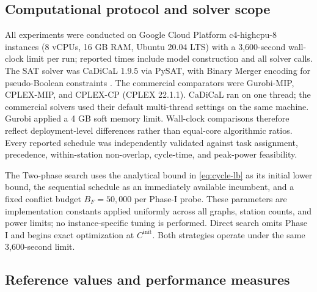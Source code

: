 \documentclass[]{interact}
\theoremstyle{plain}
\theoremstyle{definition}
\theoremstyle{remark}
\newcommand{\Cinit}{C^{\mathrm{init}}}
\begin{document}
\FloatBarrier
\subsection{Computational protocol and solver scope}

All experiments were conducted on Google Cloud Platform c4-highcpu-8 instances (8 vCPUs, 16 GB RAM, Ubuntu 20.04 LTS) with a 3,600-second wall-clock limit per run; reported times include model construction and all solver calls. The SAT solver was CaDiCaL 1.9.5 via PySAT, with Binary Merger encoding for pseudo-Boolean constraints \citep{Ignatiev2018PySAT,Biere2024CaDiCaL}. The commercial comparators were Gurobi-MIP, CPLEX-MIP, and CPLEX-CP (CPLEX 22.1.1). CaDiCaL ran on one thread; the commercial solvers used their default multi-thread settings on the same machine. Gurobi applied a 4 GB soft memory limit. Wall-clock comparisons therefore reflect deployment-level differences rather than equal-core algorithmic ratios. Every reported schedule was independently validated against task assignment, precedence, within-station non-overlap, cycle-time, and peak-power feasibility.

The Two-phase search uses the analytical bound in \eqref{eq:cycle-lb} as its initial lower bound, the sequential schedule as an immediately available incumbent, and a fixed conflict budget $B_F=50{,}000$ per Phase-I probe. These parameters are implementation constants applied uniformly across all graphs, station counts, and power limits; no instance-specific tuning is performed. Direct search omits Phase I and begins exact optimization at $\Cinit$. Both strategies operate under the same 3,600-second limit.

\subsection{Reference values and performance measures}
\end{document}

